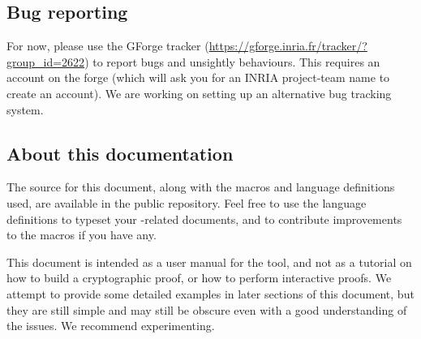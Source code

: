 \subsection{Bug reporting}
For now, please use the GForge tracker
(\url{https://gforge.inria.fr/tracker/?group_id=2622}) to report bugs and
unsightly behaviours. This requires an account on the forge (which will ask you
for an INRIA project-team name %
to create an account). We are working on setting up an alternative bug tracking
system.

\subsection{About this documentation}
The source for this document, along with the macros and language definitions
used, are available in the public repository. Feel free to use the language
definitions to typeset your \EasyCrypt-related documents, and to contribute
improvements to the macros if you have any.

This document is intended as a user manual for the \EasyCrypt tool, and not as
a tutorial on how to build a cryptographic proof, or how to perform interactive
proofs. We attempt to provide some detailed examples in later sections of this
document, but they are still simple and may still be obscure even with a good
understanding of the issues. We recommend experimenting.

